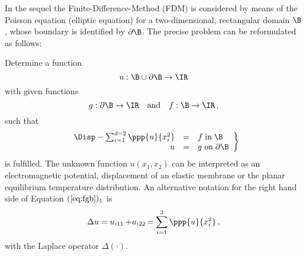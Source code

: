



















\newpage

\label{Section32}

In the sequel the Finite-Difference-Method (FDM) is 
considered by means of the Poisson equation 
(elliptic equation) for a two-dimensional, rectangular 
domain $\B$, whose boundary is identified by 
$\partial \B$. 
The precise problem can be reformulated as follows: 

Determine a function 
%
\begin{equation}
u: \B \cup \partial \B \rightarrow \IR
\end{equation} 
%
with given functions
%
\begin{equation}
g: \partial \B \rightarrow \IR 
\quad\mbox{and}\quad  f: \B \rightarrow \IR \, ,
\end{equation}
%
such that
%
\begin{eqnarray}
\left. 
\begin{array}{rcl} 
\Disp-\sum_{i=1}^{d=2}\ppp{u}{x_i^2} &=& f\;\mbox{in}\;\B \\
                                   u &=& g\;\mbox{on}\;\partial\B
\end{array} 
\right\}
\label{eq:fgb}
\end{eqnarray}
%
is fulfilled. 
The unknown function $u(x_1, x_2)$ can be interpreted as 
an electromagnetic potential, displacement of an elastic 
membrane or the planar equilibrium temperature distribution. 
An alternative notation for the right hand side of Equation 
$(\ref{eq:fgb})_1$ is 
%
\begin{equation}
\Delta u = u,_{11} + u,_{22} = 
\sum_{i=1}^2 \ppp{u}{x_i^2}  \, ,
\end{equation}
%
with the Laplace operator $\Delta (\cdot)$.

